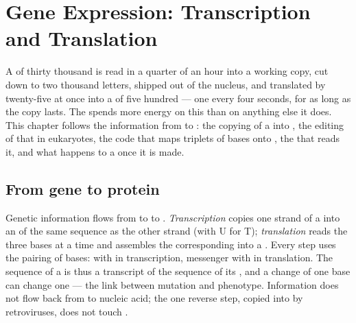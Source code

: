 \chapter{Gene Expression: Transcription and Translation}\label{ch:b1:gene-expression}

A  of thirty thousand  is read in a quarter of an hour
into a working copy, cut down to two thousand letters, shipped out of
the nucleus, and translated by twenty-five  at once into a
 of five hundred  --- one every four seconds, for as
long as the copy lasts. The  spends more energy on this than on
anything else it does. This chapter follows the information from 
to : the copying of a  into , the editing of that  in
eukaryotes, the code that maps triplets of bases onto , the
 that reads it, and what happens to a  once it is made.

\section{From gene to protein}

\begin{proposition}\label{prop:b1:gene-expression:dogma}
Genetic information flows from  to  to .
\emph{Transcription} copies one strand of a  into an  of the
same sequence as the other strand (with U for T); \emph{translation}
reads the  three bases at a time and assembles the
corresponding  into a . Every step uses the
pairing of bases:  with  in transcription, messenger with
 in translation. The sequence of a  is thus a
transcript of the sequence of its , and a change of one base can
change one  --- the link between mutation and phenotype.
Information does not flow back from  to nucleic acid; the one
reverse step,  copied into  by retroviruses, does not touch
.
\end{proposition}

